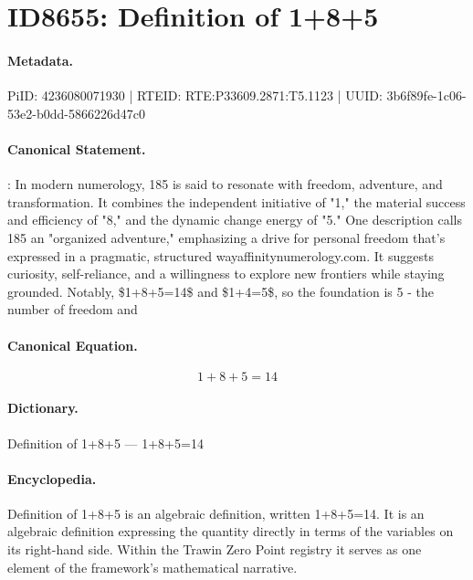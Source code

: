 \section*{ID8655: Definition of 1+8+5}
\paragraph{Metadata.}
PiID: 4236080071930 | RTEID: RTE:P33609.2871:T5.1123 | UUID: 3b6f89fe-1c06-53e2-b0dd-5866226d47c0

\paragraph{Canonical Statement.}
: In modern numerology, 185 is said to resonate with freedom, adventure, and transformation. It combines the independent initiative of "1," the material success and efficiency of "8," and the dynamic change energy of "5." One description calls 185 an "organized adventure," emphasizing a drive for personal freedom that's expressed in a pragmatic, structured wayaffinitynumerology.com. It suggests curiosity, self-reliance, and a willingness to explore new frontiers while staying grounded. Notably, \$1+8+5=14\$ and \$1+4=5\$, so the foundation is 5 - the number of freedom and

\paragraph{Canonical Equation.}
\[
1+8+5=14
\]

\paragraph{Dictionary.}
Definition of 1+8+5 — 1+8+5=14

\paragraph{Encyclopedia.}
Definition of 1+8+5 is an algebraic definition, written 1+8+5=14. It is an algebraic definition expressing the quantity directly in terms of the variables on its right-hand side. Within the Trawin Zero Point registry it serves as one element of the framework's mathematical narrative.

